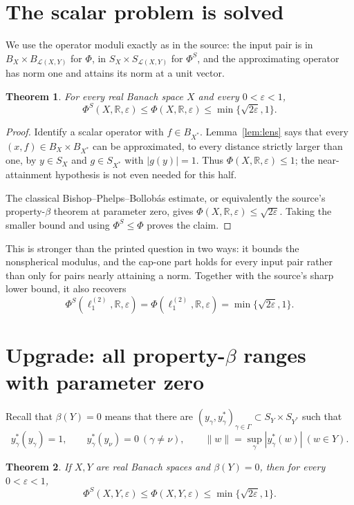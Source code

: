 \documentclass[11pt]{article}
\newtheorem{theorem}{Theorem}
\newcommand{\R}{\mathbb R}
\newcommand{\PhiS}{\Phi^{S}}
\newcommand{\Lin}{\mathcal L}
\begin{document}
\section{The scalar problem is solved}

We use the operator moduli exactly as in the source: the input pair is in
$B_X\times B_{\Lin(X,Y)}$ for $\Phi$, in
$S_X\times S_{\Lin(X,Y)}$ for $\PhiS$, and the approximating operator has
norm one and attains its norm at a unit vector.

\begin{theorem}\label{thm:scalar}
For every real Banach space $X$ and every $0<\varepsilon<1$,
\[
 \PhiS(X,\R,\varepsilon)\le \Phi(X,\R,\varepsilon)
 \le \min\{\sqrt{2\varepsilon},1\}.
\]
\end{theorem}

\begin{proof}
Identify a scalar operator with $f\in B_{X^*}$.  Lemma~\ref{lem:lens}
says that every $(x,f)\in B_X\times B_{X^*}$ can be approximated, to every
distance strictly larger than one, by $y\in S_X$ and $g\in S_{X^*}$ with
$|g(y)|=1$.  Thus $\Phi(X,\R,\varepsilon)\le1$; the near-attainment
hypothesis is not even needed for this half.

The classical Bishop--Phelps--Bollob\'as estimate, or equivalently the
source's property-$\beta$ theorem at parameter zero, gives
$\Phi(X,\R,\varepsilon)\le\sqrt{2\varepsilon}$.  Taking the smaller bound
and using $\PhiS\le\Phi$ proves the claim.
\end{proof}

This is stronger than the printed question in two ways: it bounds the
nonspherical modulus, and the cap-one part holds for every input pair rather
than only for pairs nearly attaining a norm.  Together with the source's
sharp lower bound, it also recovers
\[
 \PhiS(\ell_1^{(2)},\R,\varepsilon)
 =\Phi(\ell_1^{(2)},\R,\varepsilon)
 =\min\{\sqrt{2\varepsilon},1\}.
\]

\section{Upgrade: all property-$\beta$ ranges with parameter zero}

Recall that $\beta(Y)=0$ means that there are
$(y_\gamma,y_\gamma^*)_{\gamma\in\Gamma}\subset S_Y\times S_{Y^*}$
such that
\[
 y_\gamma^*(y_\gamma)=1,
 \qquad y_\gamma^*(y_\nu)=0\ (\gamma\ne\nu),
 \qquad \|w\|=\sup_\gamma|y_\gamma^*(w)|\ (w\in Y).
\]

\begin{theorem}\label{thm:beta0}
If $X,Y$ are real Banach spaces and $\beta(Y)=0$, then for every
$0<\varepsilon<1$,
\[
 \PhiS(X,Y,\varepsilon)\le \Phi(X,Y,\varepsilon)
 \le \min\{\sqrt{2\varepsilon},1\}.
\]
\end{theorem}
\end{document}
